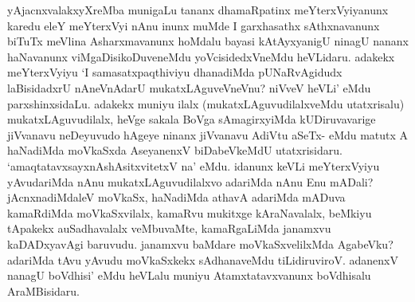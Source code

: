 \centerline{}

\begin{artha}
yAjacnxvalakxyXreMba munigaLu tananx dhamaRpatinx meYterxVyiyanunx
karedu eleY meYterxVyi nAnu inunx muMde I garxhasathx sAthxnavanunx
biTuTx meVlina Asharxmavanunx hoMdalu bayasi kAtAyxyanigU ninagU
nananx haNavanunx viMgaDisikoDuveneMdu yoVcisidedxVneMdu
heVLidaru. adakekx meYterxVyiyu `I samasatxpaqthiviyu dhanadiMda
pUNaRvAgidudx laBisidadxrU nAneVnAdarU mukatxLAguveVneVnu? niVveV
heVLi' eMdu parxshinxsidaLu. adakekx muniyu
ilalx (mukatxLAguvudilalxveMdu utatxrisalu) mukatxLAguvudilalx, heVge
sakala BoVga sAmagirxyiMda kUDiruvavarige jiVvanavu neDeyuvudo hAgeye
ninanx jiVvanavu AdiVtu aSeTx- eMdu matutx A haNadiMda moVkaSxda
AseyanenxV biDabeVkeMdU utatxrisidaru. `amaqtatavxsayxnAshAsitxvitetxV na' eMdu. idanunx keVLi
meYterxVyiyu yAvudariMda nAnu mukatxLAguvudilalxvo adariMda nAnu Enu
mADali? jAcnxnadiMdaleV moVkaSx, haNadiMda athavA adariMda mADuva
kamaRdiMda moVkaSxvilalx, kamaRvu mukitxge kAraNavalalx, beMkiyu
tApakekx auSadhavalalx veMbuvaMte, kamaRgaLiMda janamxvu kaDADxyavAgi
baruvudu. janamxvu baMdare moVkaSxvelilxMda AgabeVku? adariMda tAvu
yAvudu moVkaSxkekx sAdhanaveMdu tiLidiruviroV. adanenxV nanagU boVdhisi'
eMdu heVLalu muniyu Atamxtatavxvanunx boVdhisalu AraMBisidaru.
\end{artha}


